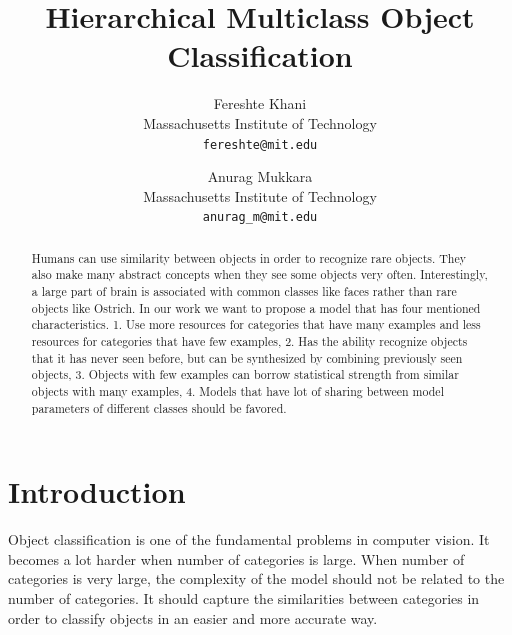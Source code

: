 \documentclass[10pt,twocolumn,letterpaper]{article}
\begin{document}
\title{Hierarchical Multiclass Object Classification }

\author{Fereshte Khani\\ 
  Massachusetts Institute of Technology\\
  {\tt\small fereshte@mit.edu}
  \and
  Anurag Mukkara\\
  Massachusetts Institute of Technology\\
  {\tt\small anurag\_m@mit.edu}
}



\maketitle

\begin{abstract}
  
Humans can use similarity between objects in order to recognize rare objects.
They also make many abstract concepts when they see some objects very often.
Interestingly, a large part of brain is associated with common classes like
faces rather than rare objects like Ostrich.  In our work we want to propose
a model that has four mentioned characteristics. 1. Use more resources for
categories that have many examples and less resources for categories that
have few examples, 2. Has the ability recognize objects that it has never
seen before, but can be synthesized by combining previously seen objects, 3.
Objects with few examples can borrow statistical strength from similar
objects with many examples, 4. Models that have lot of sharing between model
parameters of different classes should be favored.
  
\end{abstract}

\section{Introduction}

Object classification is one of the fundamental problems in computer vision.
It becomes a lot harder when number of categories is large. When number of
categories is very large, the complexity of the model should not be related to
the number of categories. It should capture the similarities between categories
in order to classify objects in an easier and more accurate way.
\end{document}
